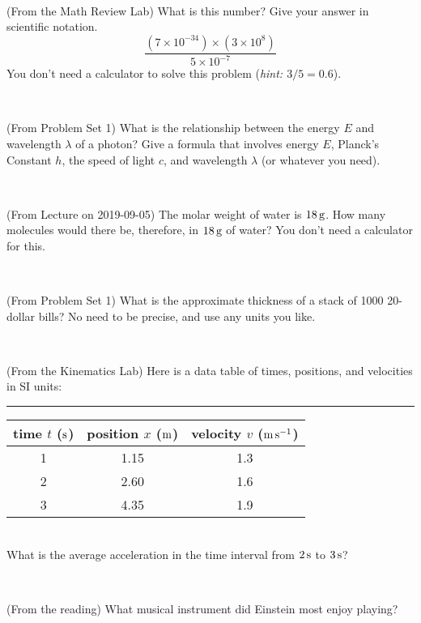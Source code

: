 \documentclass[12pt, letterpaper]{article}
\begin{document}
\vfill ~

\begin{problem} (From the Math Review Lab)
What is this number? Give your answer in scientific notation.
$$
\frac{(7\times10^{-34})\times(3\times10^8)}{5\times10^{-7}}
$$
You don't need a calculator to solve this problem (\textit{hint: $3/5=0.6$}).
\end{problem}


\vfill ~

\begin{problem} (From Problem Set 1)
What is the relationship between the energy $E$ and wavelength
$\lambda$ of a photon? Give a formula that involves energy $E$,
Planck's Constant $h$, the speed of light $c$, and wavelength
$\lambda$ (or whatever you need).
\end{problem}

\vfill ~


\clearpage


\begin{problem} (From Lecture on 2019-09-05)
The molar weight of water is $18\,\mathrm{g}$. How many molecules would there
be, therefore, in $18\,\mathrm{g}$ of water? You don't need a calculator for
this.
\end{problem}


\vfill ~

\begin{problem} (From Problem Set 1)
What is the approximate thickness of a stack of 1000 20-dollar bills?
No need to be precise, and use any units you like.
\end{problem}


\vfill ~

\begin{problem} (From the Kinematics Lab)
Here is a data table of times, positions, and velocities in SI units:\\
\rule{1.0in}{0pt}\begin{tabular}{c|c|c}
time $t$ ($\mathrm{s}$) & position $x$ ($\mathrm{m}$) & velocity $v$ ($\mathrm{m}\,\mathrm{s}^{-1}$) \\
\hline
1 & 1.15 & 1.3 \\
2 & 2.60 & 1.6 \\
3 & 4.35 & 1.9 \\
\hline
\end{tabular}\\
What is the average acceleration in the time interval from $2\,\mathrm{s}$ to $3\,\mathrm{s}$?
\end{problem}


\vfill ~

\begin{problem} (From the reading)
What musical instrument did Einstein most enjoy playing?
\end{problem}
\end{document}
